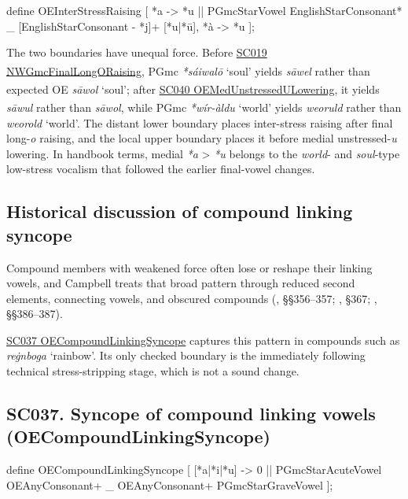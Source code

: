 \documentclass[
  british,
  a4paper,
  openany]{book}
\providecommand{\Pred}[1]{\textsuperscript{\dag}\emph{#1}}
\providecommand{\Recon}[1]{\emph{*#1}}
{\catcode`→=\active \global\def→{\ensuremath{\rightarrow}}}
\providecommand{\texorpdfstring}[2]{#1}
\DeclareRobustCommand{\CAPRRuleHeading}[2]{%
  #1\texorpdfstring{\\(#2)}{ (#2)}%
}
\providecommand{\Pred}[1]{\textsuperscript{\dag}\emph{#1}}
\providecommand{\Recon}[1]{\emph{*#1}}
{\catcode`→=\active \global\def→{\ensuremath{\rightarrow}}}
\begin{document}
\begin{ReaderFacingFoma}
define OEInterStressRaising [
    {*a} -> {*u}
        || PGmcStarVowel EnglishStarConsonant* _
           [EnglishStarConsonant - {*j}]+ [{*u}|{*ū}],
    {*à} -> {*u}
];
\end{ReaderFacingFoma}

The two boundaries have unequal force. Before
\hyperref[rule-NWGmcFinalLongORaising]{SC019 NWGmcFinalLongORaising},
PGmc \Recon{sáiwalō} `soul' yields \Pred{sāwel} rather than expected OE
\emph{sāwol} `soul'; after
\hyperref[rule-OEMedUnstressedULowering]{SC040
OEMedUnstressedULowering}, it yields \Pred{sāwul} rather than
\emph{sāwol}, while PGmc \Recon{wír-àldu} `world' yields \Pred{weoruld}
rather than \emph{weorold} `world'. The distant lower boundary places
inter-stress raising after final long-\emph{o} raising, and the local
upper boundary places it before medial unstressed-\emph{u} lowering. In
handbook terms, medial \emph{*a} \textgreater{} \emph{*u} belongs to the
\emph{world}- and \emph{soul}-type low-stress vocalism that followed the
earlier final-vowel changes.

\subsection{Historical discussion of compound linking
syncope}\label{historical-discussion-of-compound-linking-syncope}

Compound members with weakened force often lose or reshape their linking
vowels, and Campbell treats that broad pattern through reduced second
elements, connecting vowels, and obscured compounds
(, §§356--357;
, §367;
, §§386--387).

\hyperref[rule-OECompoundLinkingSyncope]{SC037 OECompoundLinkingSyncope}
captures this pattern in compounds such as \emph{reġnboga} `rainbow'.
Its only checked boundary is the immediately following technical
stress-stripping stage, which is not a sound change.

\subsection{\texorpdfstring{\CAPRRuleHeading{SC037. Syncope of compound linking vowels}{OECompoundLinkingSyncope}}{}}\label{rule-OECompoundLinkingSyncope}

\begin{ReaderFacingFoma}
define OECompoundLinkingSyncope [
    [{*a}|{*i}|{*u}] -> 0
        || PGmcStarAcuteVowel OEAnyConsonant+ _
           OEAnyConsonant+ PGmcStarGraveVowel
];
\end{ReaderFacingFoma}
\end{document}

